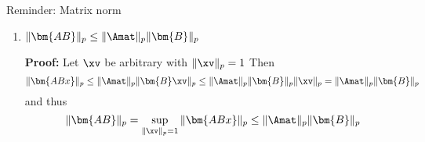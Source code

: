 \documentclass[11pt,compress,t,notes=noshow, xcolor=table]{beamer}
\begin{document}
\begin{vbframe}{Reminder: Matrix norm}
\begin{enumerate}
\item $ \|\bm{AB}\|_p \leq \|\Amat\|_p \|\bm{B}\|_p$\\
  \vspace{0.2cm}
  \begin{footnotesize}
  \textbf{Proof:}
  Let $\xv$ be arbitrary with $\|\xv\|_p = 1$ Then
  $$
  \|\bm{ABx}\|_p \leq \|\Amat\|_p \|\bm{B}\xv\|_p \leq \|\Amat\|_p \|\bm{B}\|_p \|\xv\|_p = \|\Amat\|_p \|\bm{B}\|_p
  $$
  and thus 
  $$
  \|\bm{AB}\|_p = \sup_{\|\xv\|_p = 1} \|\bm{ABx}\|_p \leq \|\Amat\|_p \|\bm{B}\|_p
  $$
  
  \end{footnotesize}
  
\end{enumerate}


\end{vbframe}

\endlecture
\end{document}

